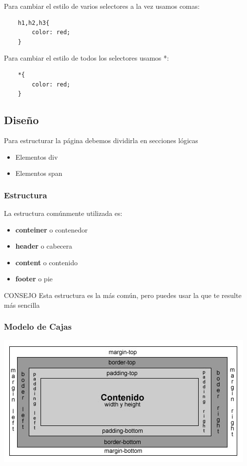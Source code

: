 \documentclass{beamer}
\begin{document}
\begin{frame}[fragile]
Para cambiar el estilo de varios selectores a la vez usamos comas:
	\begin{center}
	\begin{verbatim}
	h1,h2,h3{
	    color: red;
	}
	\end{verbatim}
	\end{center}
\pause
Para cambiar el estilo de todos los selectores usamos *:
	\begin{center}
	\begin{verbatim}
	*{
	    color: red;
	}
	\end{verbatim}
	\end{center}
\end{frame}
	\subsection{Diseño}
\begin{frame} %
Para estructurar la página debemos dividirla en secciones lógicas
	\begin{itemize}
	\item Elementos div
	\item Elementos span
	\end{itemize}
\end{frame}

\begin{frame} %
\frametitle{Estructura}
La estructura comúnmente utilizada es:
	\begin{itemize}
	\item \textbf{conteiner} o contenedor
	\item \textbf{header} o cabecera
	\item \textbf{content} o contenido
	\item \textbf{footer} o pie
	\end{itemize}
	\pause
	\begin{exampleblock}{CONSEJO}
	Esta estructura es la más común, pero puedes usar la que te resulte más sencilla
	\end{exampleblock}
\end{frame}

\begin{frame} %
\frametitle{Modelo de Cajas}
	\begin{center}
	\includegraphics[scale=.5]{images/ModeloCajas.jpg} 
	\end{center}
\end{frame}
\end{document}
